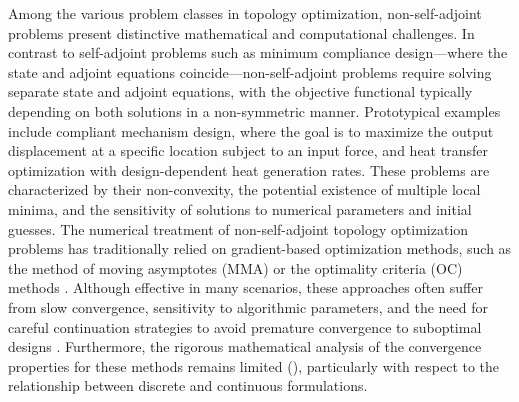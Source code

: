 \documentclass{amsart}
\begin{document}
Among the various problem classes in topology optimization, non-self-adjoint problems present distinctive mathematical and computational challenges. In contrast to self-adjoint problems such as minimum compliance design—where the state and adjoint equations coincide—non-self-adjoint problems require solving separate state and adjoint equations, with the objective functional typically depending on both solutions in a non-symmetric manner. Prototypical examples include compliant mechanism design, where the goal is to maximize the output displacement at a specific location subject to an input force, and heat transfer optimization with design-dependent heat generation rates. These problems are characterized by their non-convexity, the potential existence of multiple local minima, and the sensitivity of solutions to numerical parameters and initial guesses.
The numerical treatment of non-self-adjoint topology optimization problems has traditionally relied on gradient-based optimization methods, such as the method of moving asymptotes (MMA) or the optimality criteria (OC) methods \cite{alla}. Although effective in many scenarios, these approaches often suffer from slow convergence, sensitivity to algorithmic parameters, and the need for careful continuation strategies to avoid premature convergence to suboptimal designs \cite{Deaton2014}. Furthermore, the rigorous mathematical analysis of the convergence properties for these methods remains limited (\cite{Suli2022}), particularly with respect to the relationship between discrete and continuous formulations.
\end{document}

